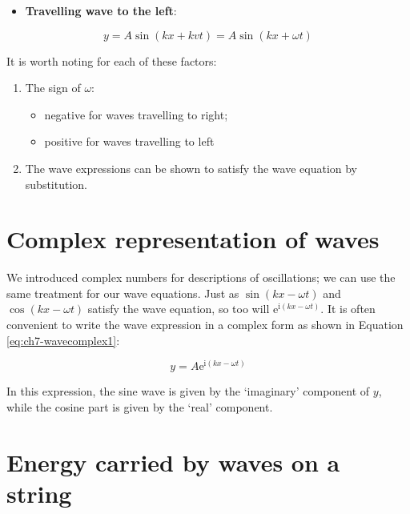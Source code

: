 \documentclass[
]{book}
\providecommand{\tightlist}{%
  \setlength{\itemsep}{0pt}\setlength{\parskip}{0pt}}
\begin{document}
\begin{itemize}
\tightlist
\item
  \textbf{Travelling wave to the left}:
\end{itemize}

\begin{equation}
y = A \sin \left( kx + kvt \right) = A \sin \left( kx + \omega t \right)
\label{eq:ch7-travellingtoleft1}
\end{equation}

It is worth noting for each of these factors:

\begin{enumerate}
\def\labelenumi{\arabic{enumi}.}
\tightlist
\item
  The sign of \(\omega\):

  \begin{itemize}
  \tightlist
  \item
    negative for waves travelling to right;
  \item
    positive for waves travelling to left
  \end{itemize}
\item
  The wave expressions can be shown to satisfy the wave equation by substitution.
\end{enumerate}

\hypertarget{sec-ch7-complexrep}{%
\section{Complex representation of waves}\label{sec-ch7-complexrep}}

We introduced complex numbers for descriptions of oscillations; we can use the same treatment for our wave equations. Just as \(\sin(kx - \omega t)\) and \(\cos(kx-\omega t)\) satisfy the wave equation, so too will \(\mathrm{e}^{\mathrm{i}(kx-\omega t)}\). It is often convenient to write the wave expression in a complex form as shown in Equation \eqref{eq:ch7-wavecomplex1}:

\begin{equation}
y = A \mathrm{e}^{\mathrm{i}(kx-\omega t)}
\label{eq:ch7-wavecomplex1}
\end{equation}

In this expression, the sine wave is given by the `imaginary' component of \(y\), while the cosine part is given by the `real' component.

\hypertarget{sec-ch7-energywavesstring}{%
\section{Energy carried by waves on a string}\label{sec-ch7-energywavesstring}}
\end{document}

